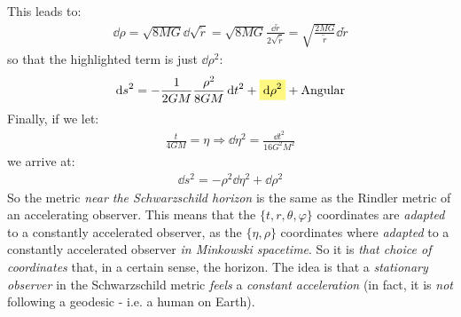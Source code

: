 \documentclass[../template.tex]{subfiles}
\begin{document}
This leads to:
\begin{align*}
    \dd{\rho} = \sqrt{8 MG} \dd{\sqrt{\tilde{r}}} = \sqrt{8 MG} \frac{\dd{\tilde{r}}}{2\sqrt{\tilde{r}}}  = \sqrt{\frac{2MG}{\tilde{r}} } \dd{\tilde{r}}
\end{align*}
so that the highlighted term is just $\dd{\rho}^2$:
\begin{align*}
    \dd{s}^2 = -\frac{1}{2GM} \frac{\rho^2}{8 GM} \dd{t}^2 +\hlc{Yellow}{ \dd{\rho}^2 }+ \text{Angular}  
\end{align*} 
Finally, if we let:
\begin{align*}
    \frac{t}{4GM} = \eta \Rightarrow \dd{\eta}^2 = \frac{\dd{t}^2}{16 G^2M^2}  
\end{align*}
we arrive at:
\begin{align*}
    \dd{s}^2 = -\rho^2 \dd{\eta}^2 + \dd{\rho}^2
\end{align*}
So the metric \textit{near the Schwarzschild horizon} is the same as the Rindler metric of an accelerating observer. This means that the $\{t,r,\theta,\varphi\}$ coordinates are \textit{adapted} to a constantly accelerated observer, as the $\{\eta, \rho\}$ coordinates where \textit{adapted} to a constantly accelerated observer \textit{in Minkowski spacetime}. So it is \textit{that choice of coordinates} that, in a certain sense,  the horizon. The idea is that a \textit{stationary observer} in the Schwarzschild metric \textit{feels} a \textit{constant acceleration} (in fact, it is \textit{not} following a geodesic - i.e. a human on Earth).
\end{document}

